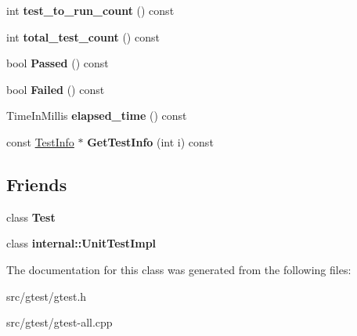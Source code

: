 \begin{DoxyCompactItemize}
int {\bfseries test\+\_\+to\+\_\+run\+\_\+count} () const
\item 
\mbox{\label{classtesting_1_1_test_case_aba3cab19aaf7295284f0832f2cf895a3}} 
int {\bfseries total\+\_\+test\+\_\+count} () const
\item 
\mbox{\label{classtesting_1_1_test_case_a29bbfd227b732a90198b5280c039c271}} 
bool {\bfseries Passed} () const
\item 
\mbox{\label{classtesting_1_1_test_case_ae71c30eab6f1673b82090a0e745c2aa5}} 
bool {\bfseries Failed} () const
\item 
\mbox{\label{classtesting_1_1_test_case_acd7d6a77bce06da6ef90f5dad1c4def1}} 
Time\+In\+Millis {\bfseries elapsed\+\_\+time} () const
\item 
\mbox{\label{classtesting_1_1_test_case_a441e0eca232643671dc365c2924c255c}} 
const \mbox{\hyperlink{classtesting_1_1_test_info}{Test\+Info}} $\ast$ {\bfseries Get\+Test\+Info} (int i) const
\end{DoxyCompactItemize}
\subsection*{Friends}
\begin{DoxyCompactItemize}
\item 
\mbox{\label{classtesting_1_1_test_case_a5b78b1c2e1fa07ffed92da365593eaa4}} 
class {\bfseries Test}
\item 
\mbox{\label{classtesting_1_1_test_case_acc0a5e7573fd6ae7ad1878613bb86853}} 
class {\bfseries internal\+::\+Unit\+Test\+Impl}
\end{DoxyCompactItemize}


The documentation for this class was generated from the following files\+:\begin{DoxyCompactItemize}
\item 
src/gtest/gtest.\+h\item 
src/gtest/gtest-\/all.\+cpp\end{DoxyCompactItemize}
